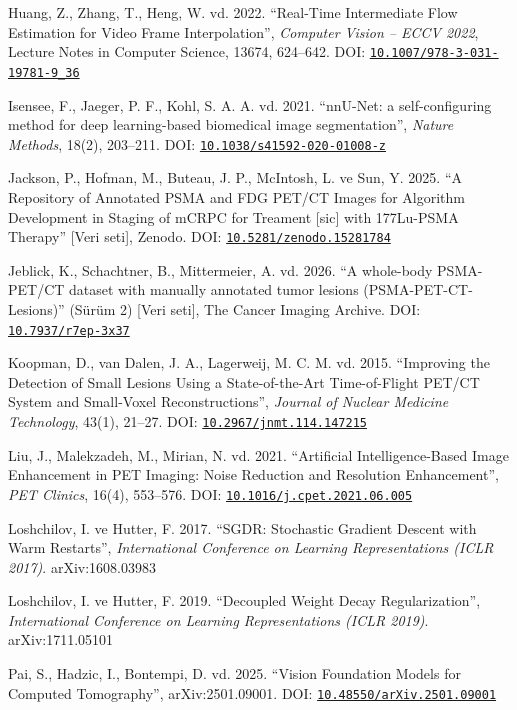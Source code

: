 \documentclass[11pt,a4paper]{article}
\newcommand{\doi}[1]{DOI: \href{https://doi.org/#1}{\nolinkurl{#1}}}
\begin{document}
\begin{list}{}{\setlength{\leftmargin}{1.5em}\setlength{\itemindent}{-1.5em}%
  \setlength{\itemsep}{0.25\baselineskip}\setlength{\parsep}{0pt}}
\item Huang, Z., Zhang, T., Heng, W. vd. 2022. ``Real-Time Intermediate Flow Estimation for Video
Frame Interpolation'', \emph{Computer Vision -- ECCV 2022}, Lecture Notes in Computer Science,
13674, 624--642. \doi{10.1007/978-3-031-19781-9_36}

\item Isensee, F., Jaeger, P. F., Kohl, S. A. A. vd. 2021. ``nnU-Net: a self-configuring method
for deep learning-based biomedical image segmentation'', \emph{Nature Methods}, 18(2), 203--211.
\doi{10.1038/s41592-020-01008-z}

\item Jackson, P., Hofman, M., Buteau, J. P., McIntosh, L. ve Sun, Y. 2025. ``A Repository of
Annotated PSMA and FDG PET/CT Images for Algorithm Development in Staging of mCRPC for Treament
[sic] with 177Lu-PSMA Therapy'' [Veri seti], Zenodo. \doi{10.5281/zenodo.15281784}

\item Jeblick, K., Schachtner, B., Mittermeier, A. vd. 2026. ``A whole-body PSMA-PET/CT dataset
with manually annotated tumor lesions (PSMA-PET-CT-Lesions)'' (Sürüm 2) [Veri seti], The Cancer
Imaging Archive. \doi{10.7937/r7ep-3x37}

\item Koopman, D., van Dalen, J. A., Lagerweij, M. C. M. vd. 2015. ``Improving the Detection of
Small Lesions Using a State-of-the-Art Time-of-Flight PET/CT System and Small-Voxel
Reconstructions'', \emph{Journal of Nuclear Medicine Technology}, 43(1), 21--27.
\doi{10.2967/jnmt.114.147215}

\item Liu, J., Malekzadeh, M., Mirian, N. vd. 2021. ``Artificial Intelligence-Based Image
Enhancement in PET Imaging: Noise Reduction and Resolution Enhancement'', \emph{PET Clinics},
16(4), 553--576. \doi{10.1016/j.cpet.2021.06.005}

\item Loshchilov, I. ve Hutter, F. 2017. ``SGDR: Stochastic Gradient Descent with Warm Restarts'',
\emph{International Conference on Learning Representations (ICLR 2017)}. arXiv:1608.03983

\item Loshchilov, I. ve Hutter, F. 2019. ``Decoupled Weight Decay Regularization'',
\emph{International Conference on Learning Representations (ICLR 2019)}. arXiv:1711.05101

\item Pai, S., Hadzic, I., Bontempi, D. vd. 2025. ``Vision Foundation Models for Computed
Tomography'', arXiv:2501.09001. \doi{10.48550/arXiv.2501.09001}


\end{list}
\end{document}
